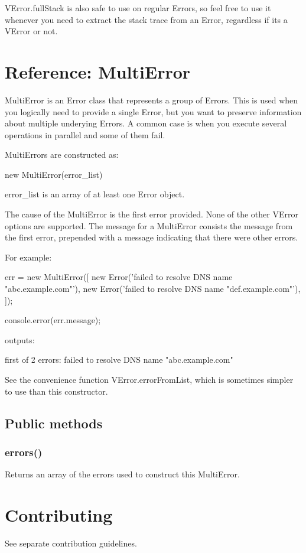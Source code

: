 {\ttfamily V\+Error.\+full\+Stack} is also safe to use on regular {\ttfamily Error}s, so feel free to use it whenever you need to extract the stack trace from an {\ttfamily Error}, regardless if it\textquotesingle{}s a {\ttfamily V\+Error} or not.

\section*{Reference\+: Multi\+Error}

Multi\+Error is an Error class that represents a group of Errors. This is used when you logically need to provide a single Error, but you want to preserve information about multiple underying Errors. A common case is when you execute several operations in parallel and some of them fail.

Multi\+Errors are constructed as\+:


\begin{DoxyCode}
new MultiError(error\_list)
\end{DoxyCode}


{\ttfamily error\+\_\+list} is an array of at least one {\ttfamily Error} object.

The cause of the Multi\+Error is the first error provided. None of the other {\ttfamily V\+Error} options are supported. The {\ttfamily message} for a Multi\+Error consists the {\ttfamily message} from the first error, prepended with a message indicating that there were other errors.

For example\+:


\begin{DoxyCode}
err = new MultiError([
    new Error('failed to resolve DNS name "abc.example.com"'),
    new Error('failed to resolve DNS name "def.example.com"'),
]);

console.error(err.message);
\end{DoxyCode}


outputs\+: \begin{DoxyVerb}first of 2 errors: failed to resolve DNS name "abc.example.com"
\end{DoxyVerb}


See the convenience function {\ttfamily V\+Error.\+error\+From\+List}, which is sometimes simpler to use than this constructor.

\subsection*{Public methods}

\subsubsection*{{\ttfamily errors()}}

Returns an array of the errors used to construct this Multi\+Error.

\section*{Contributing}

See separate contribution guidelines. 